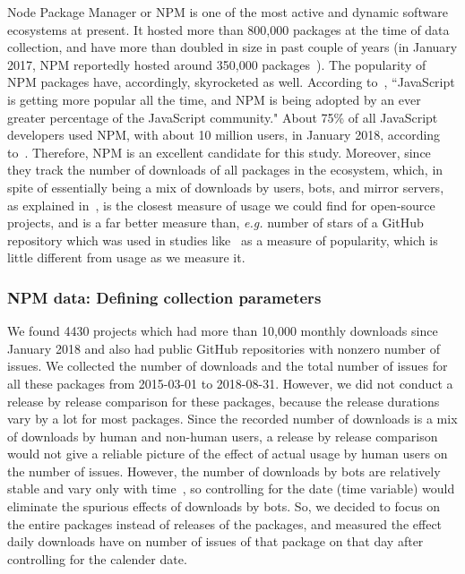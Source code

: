 \documentclass[smallcondensed]{svjour3}     %
\begin{document}
Node Package Manager or NPM is one of the most active and dynamic software ecosystems at present. It  hosted more than 800,000 packages at the time of data collection, and have more than doubled in size in past couple of years (in January 2017, NPM reportedly hosted around 350,000 packages~\cite{npmpkg}). The popularity of NPM packages have, accordingly, skyrocketed as well. According to~\cite{npmpop}, ``JavaScript is getting more popular all the time, and NPM is being adopted by an ever greater percentage of the JavaScript community." About 75\% of all JavaScript developers used NPM, with about 10 million users, in January 2018, according to~\cite{npmpop}. Therefore, NPM is an excellent candidate for this study. Moreover, since they track the number of downloads of all packages in the ecosystem, which, in spite of essentially being a mix of downloads by users, bots, and mirror servers, as explained in~\cite{npmdl}, is the closest measure of
usage we could find for open-source projects, and is a far better measure than, \emph{e.g.} number of stars of a GitHub repository which was used in studies like~\cite{borges2016understanding} as a measure of popularity, which is little different from usage as we measure it.

\subsubsection{NPM data: Defining collection parameters}
 We found 4430 projects which had more than 10,000
monthly downloads since January 2018 and also had public GitHub
repositories with nonzero number of issues.  We collected the number
of downloads and the total number of issues for all these packages
from 2015-03-01 to 2018-08-31. However, we did not conduct a release
by release comparison for these packages, because the release
durations vary by a lot for most packages. Since the recorded number
of downloads is a mix of downloads by human and non-human users, a
release by release comparison would not give a reliable picture of
the effect of actual usage by human users on the number of
issues. However, the number of downloads by bots are relatively
stable and vary only with time~\cite{npmdl}, so controlling for the date (time variable) would
eliminate the spurious effects of downloads by bots. So, we decided
to focus on the entire packages instead of releases of the packages,
and measured the effect daily downloads have on number of issues of
that package on that day after controlling for the calender date.
\end{document}
